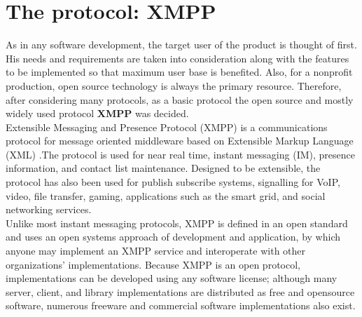 \documentclass{SureshLimkar}
\begin{document}
\section {The protocol: XMPP}
 \hspace{0.5 in}As in any software development, the target user of the product is thought of first. His needs and requirements are taken into consideration along with the features to be implemented so that maximum user base is benefited. Also, for a non­profit production, open source technology is always the primary resource. Therefore, after considering many protocols, as a basic protocol the open source and mostly widely used protocol \textbf{XMPP} was decided.
 \\ 
 \hspace{0.5 in}Extensible Messaging and Presence Protocol (XMPP) is a communications protocol for
message ­oriented middleware based on Extensible Markup Language (XML) .The
protocol is used for near real­ time, instant messaging (IM), presence information, and
contact list maintenance. Designed to be extensible, the protocol has also been used for
publish­ subscribe systems, signalling for VoIP, video, file transfer, gaming, applications
such as the smart grid, and social networking services.
\\
\hspace{0.5 in}Unlike most instant messaging protocols, XMPP is defined in an open standard and
uses an open systems approach of development and application, by which anyone may
implement an XMPP service and interoperate with other organizations' implementations.
Because XMPP is an open protocol, implementations can be developed using any
software license; although many server, client, and library implementations are
distributed as free and open­source software, numerous freeware and commercial
software implementations also exist.
\\ \\
\newpage
\end{document}
